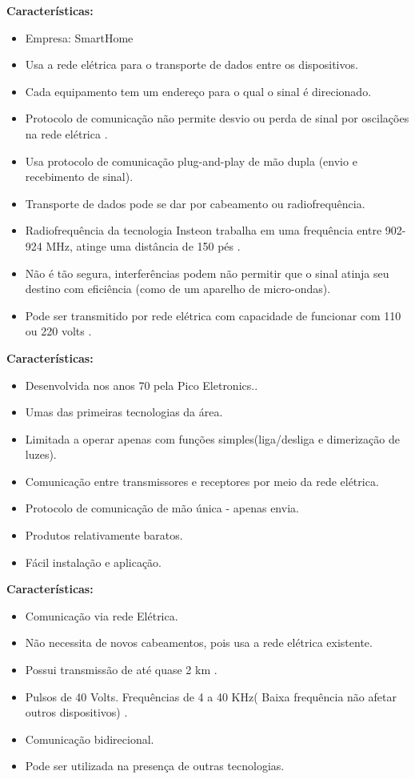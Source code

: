\textbf{Características:}
\begin{itemize}
\item Empresa: SmartHome
\item Usa a rede elétrica para o transporte de dados entre os dispositivos.
\item Cada equipamento tem um endereço para o qual o sinal é direcionado.
\item Protocolo de comunicação não permite desvio ou perda de sinal por oscilações na rede elétrica \cite{PrincipaisTeruelFilho}.
\item Usa protocolo de comunicação plug-and-play de mão dupla (envio e recebimento de sinal).
\item Transporte de dados pode se dar por cabeamento ou radiofrequência.
\item Radiofrequência da tecnologia Insteon trabalha em uma frequência entre 902-924 MHz, atinge uma distância de 150 pés \cite{2005BeyondDritsas}.
\item Não é tão segura, interferências podem não permitir que o sinal atinja seu destino com eficiência (como de um aparelho de micro-ondas).
\item Pode ser transmitido por rede elétrica com capacidade de funcionar com 110 ou 220 volts \cite{2005BeyondDritsas}.
\end{itemize}

\textbf{Características:}
\begin{itemize}
\item Desenvolvida nos anos 70 pela Pico Eletronics..
\item Umas das primeiras tecnologias da área.
\item Limitada a operar apenas com funções simples(liga/desliga e dimerização de luzes).
\item Comunicação entre transmissores e receptores por meio da rede elétrica\cite{2004ResidenciasBolzani}.
\item Protocolo de comunicação de mão única - apenas envia.
\item Produtos relativamente baratos.
\item Fácil instalação e aplicação.
\end{itemize}

\textbf{Características:}
\begin{itemize}
\item Comunicação via rede Elétrica.
\item Não necessita de novos cabeamentos, pois usa a rede elétrica existente. 
\item Possui transmissão de até quase 2 km \cite{TecnologiaConverge}.
\item Pulsos de 40 Volts. Frequências de 4 a 40 KHz( Baixa frequência não afetar outros dispositivos) \cite{TecnologiaConverge}.
\item Comunicação bidirecional.
\item Pode ser utilizada na presença de outras tecnologias.
\end{itemize}

